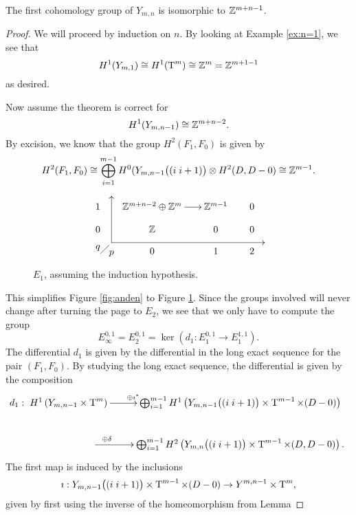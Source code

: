 \begin{theorem}
  \label{thm:forste}
  The first cohomology group of $Y_{m,n}$ is isomorphic to $\mathbb{Z}^{m+n-1}$.
\end{theorem}
\begin{proof}
  We will proceed by induction on $n$. By looking at Example
  \ref{ex:n=1}, we see that
  \[ H^1(Y_{m,1}) \cong H^1(\operatorname{T}^{m}) \cong \mathbb{Z}^m = \mathbb{Z}^{m+1-1} \]
  as desired.

  Now assume the theorem is correct for 
  \[ H^1(Y_{m,n-1}) \cong \mathbb{Z}^{m+n-2}. \] 
  By excision, we know that the group $H^2(F_1,F_0)$ is given by
  \[ H^2(F_1,F_0) \cong \bigoplus_{i=1}^{m-1} H^0(Y_{m,n-1}\big((i\;
  i+1)\big) \otimes H^2(D,D-0) \cong \mathbb{Z}^{m-1}. \]
  \begin{figure}[ht]
    \[ \xy
    (5,4); (5,-13); **\dir{-}; (5,4); *\dir{>};
    (5,-13); (61,-13); **\dir{-}; *\dir{<};
    (0,-15)*{q}; (5,-17)*{p};
    (1,-17); (4,-14); **\dir{-};
    (0,0)\xymatrix@R=1em@C=1.7em{
      1 & \Z^{m+n-2}\oplus\Z^m \ar[r]& \Z^{m-1} & 0 \\
      0 & \Z & 0 & 0 \\
      & 0 & 1 & 2
    } \endxy \]
    \caption{$E_1$, assuming the induction hypothesis.}
    \label{fig:tredje}
  \end{figure}
  This simplifies Figure \ref{fig:anden} to Figure
  \ref{fig:tredje}. Since the groups involved will never change after
  turning the page to $E_2$, we see that we only have to compute the
  group
  \[ E_\infty^{0,1} = E_2^{0,1} = \ker \left( d_1 : E_1^{0,1} \to
    E_1^{1,1} \right). \]
  The differential $d_1$ is given by the differential in the long
  exact sequence for the pair $(F_1,F_0)$. By studying the long exact
  sequence, the differential is given by the composition
  \[ d_1 : \xymatrix{ H^1\left(Y_{m,n-1}\times \T^m\right)
    \ar[r]^<<<<<<<<<{\oplus\imath^*}  & \bigoplus_{i=1}^{m-1}
    H^1\left(Y_{m,n-1}\big((i\; i+1)\big)\times \T^{m-1} \times
      (D-0)\right)  \\
    \hspace{5em}\ar[r]^<<<<<{\oplus\delta} & \bigoplus_{i=1}^{m-1}
    H^2\left(Y_{m,n}\big((i\; i+1)\big)\times \T^{m-1} \times
      (D,D-0)\right).}\] 
  The first map is induced by the inclusions
  \[ \imath : Y_{m,n-1}\big((i\; i+1)\big) \times \operatorname{T}^{m-1} \times (D-0)
  \to Y^{m,n-1}\times \operatorname{T}^m, \] 
  given by first using the inverse of the homeomorphism from Lemma

\end{proof}
